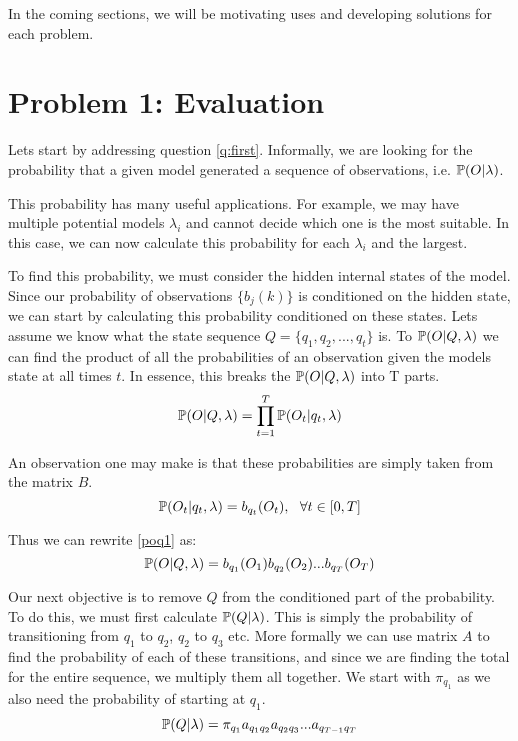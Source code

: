 In the coming sections, we will be motivating uses and developing solutions for each problem. 

\section{Problem 1: Evaluation}
Lets start by addressing question \ref{q:first}. Informally, we are looking for the probability that a given model generated a sequence of observations, i.e. $\mathbb{P} (O | \lambda)$.

This probability has many useful applications. For example, we may have multiple potential models $\lambda_i$ and cannot decide which one is the most suitable. In this case, we can now calculate this probability for each $\lambda_i$ and the largest.

To find this probability, we must consider the hidden internal states of the model. Since our probability of observations $\{b_j(k)\}$ is conditioned on the hidden state, we can start by calculating this probability conditioned on these states. Lets assume we know what the state sequence $Q = \{q_1,q_2,...,q_t\}$ is. To $\mathbb{P} (O | Q, \lambda)$ we can find the product of all the probabilities of an observation given the models state at all times $t$. In essence, this breaks the  $\mathbb{P} (O | Q, \lambda)$ into T parts. 
\begin{equation}
    \label{poq1}
    \mathbb{P} (O | Q, \lambda) = \prod_{t=1}^T \mathbb{P} (O_t | q_t, \lambda)
\end{equation}


An observation one may make is that these probabilities are simply taken from the matrix $B$. 
\begin{equation}
    \mathbb{P} (O_t | q_t, \lambda) = b_{q_t}(O_t), \ \ \forall t \in [0,T] 
\end{equation}

Thus we can rewrite \ref{poq1} as:
\begin{equation}
    \label{oqlam}
    \mathbb{P} (O | Q, \lambda) = b_{q_1}(O_1) b_{q_2}(O_2)  ...  b_{q_T}(O_T)
\end{equation}

Our next objective is to remove $Q$ from the conditioned part of the probability. To do this, we must first calculate $\mathbb{P} (Q | \lambda)$. This is simply the probability of transitioning from $q_1$ to $q_2$, $q_2$ to $q_3$ etc. More formally we can use matrix $A$ to find the probability of each of these transitions, and since we are finding the total for the entire sequence, we multiply them all together. We start with $\pi_{q_1}$ as we also need the probability of starting at $q_1$.
\begin{equation}
    \label{qlam}
    \mathbb{P} ( Q | \lambda) = \pi_{q_1} a_{q_1q_2} a_{q_2q_3} ... a_{q_{T-1}q_T}
\end{equation}

